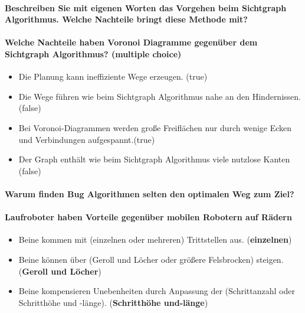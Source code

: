 \paragraph{Beschreiben Sie mit eigenen Worten das Vorgehen beim Sichtgraph Algorithmus. Welche Nachteile bringt diese Methode mit?}
\paragraph{Welche Nachteile haben Voronoi Diagramme gegenüber dem Sichtgraph Algorithmus? (multiple choice)}
\begin{itemize}
	\item Die Planung kann ineffiziente Wege erzeugen. (true)
    \item Die Wege führen wie beim Sichtgraph Algorithmus nahe an den Hindernissen.(false)
    \item Bei Voronoi-Diagrammen werden große Freiflächen nur durch wenige Ecken und Verbindungen aufgespannt.(true)
    \item Der Graph enthält wie beim Sichtgraph Algorithmus viele nutzlose Kanten (false)
\end{itemize}
\paragraph{Warum finden Bug Algorithmen selten den optimalen Weg zum Ziel?}
\paragraph{Laufroboter haben Vorteile gegenüber mobilen Robotern auf Rädern}
\begin{itemize}
	\item Beine kommen mit (einzelnen oder mehreren) Trittstellen aus. (\textbf{einzelnen})
    \item Beine können über (Geroll und Löcher oder größere Felsbrocken) steigen. (\textbf{Geroll und Löcher})
    \item Beine kompensieren Unebenheiten durch Anpassung der (Schrittanzahl oder Schritthöhe und -länge). (\textbf{Schritthöhe und-länge})
\end{itemize}




 




























